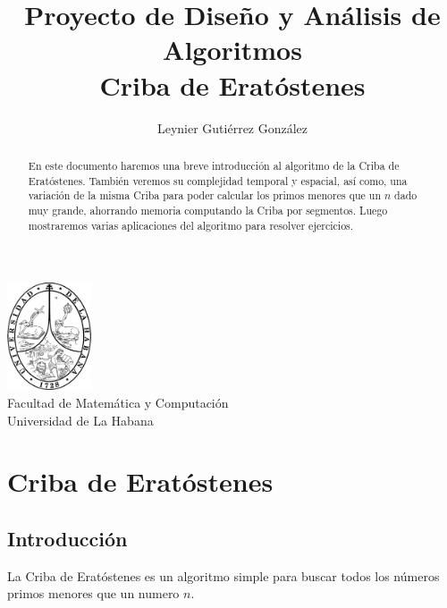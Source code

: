 \documentclass[12pt]{article}
\title{Proyecto de Diseño y Análisis de Algoritmos\\ \vspace{.2cm} \textbf{Criba de Eratóstenes}}
\author{Leynier Gutiérrez González}
\newcommand{\nl}{\vspace{0.3cm}}
\begin{document}
\maketitle

\vspace{0.5cm}

\begin{center}
	\vspace{0.2cm}
	\includegraphics[width=2.5cm]{images/escudo.png}\\
	\vspace{0.2cm}
	Facultad de Matemática y Computación\\
	\vspace{0.1cm}
	Universidad de La Habana\\
	\vspace{1cm}
\end{center}

\vspace{1cm}

\begin{abstract}
	En este documento haremos una breve introducción al algoritmo de la Criba de Eratóstenes. También veremos su complejidad temporal y espacial, así como, una variación de la misma Criba para poder calcular los primos menores que un $n$ dado muy grande, ahorrando memoria computando la Criba por segmentos. Luego mostraremos varias aplicaciones del algoritmo para resolver ejercicios.
\end{abstract}

\newpage

\tableofcontents

\newpage

\section{Criba de Eratóstenes}

\subsection{Introducción}

\nl

La Criba de Eratóstenes es un algoritmo simple para buscar todos los números primos menores que un numero $n$.
\end{document}
